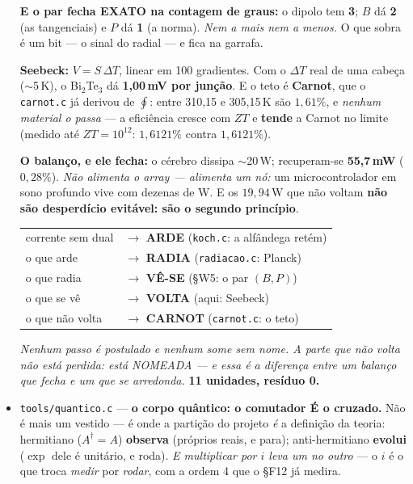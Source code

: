 \documentclass[11pt]{article}
\newcommand{\code}[1]{\texttt{\small #1}}
\theoremstyle{plain}
\theoremstyle{remark}
\begin{document}
\begin{itemize}
\textbf{E o par fecha EXATO na contagem de graus:} o dipolo tem \textbf{3}; $B$ dá \textbf{2} (as
tangenciais) e $P$ dá \textbf{1} (a norma). \emph{Nem a mais nem a menos.} O que sobra é um bit --- o
sinal do radial --- e fica na garrafa.

\textbf{Seebeck:} $V = S\,\Delta T$, linear em 100 gradientes. Com o $\Delta T$ real de uma cabeça
($\sim$5\,K), o Bi$_2$Te$_3$ dá \textbf{1,00\,mV por junção}. E o teto é \textbf{Carnot}, que o
\code{carnot.c} já derivou de $\oint$: entre 310,15 e 305,15\,K são $1{,}61\%$, e \emph{nenhum
material o passa} --- a eficiência cresce com $ZT$ e \textbf{tende} a Carnot no limite (medido até
$ZT = 10^{12}$: $1{,}6121\%$ contra $1{,}6121\%$).

\textbf{O balanço, e ele fecha:} o cérebro dissipa $\sim$20\,W; recuperam-se \textbf{55,7\,mW}
($0{,}28\%$). \emph{Não alimenta o array --- alimenta um nó:} um microcontrolador em sono profundo
vive com dezenas de \textmu W. E os $19{,}94$\,W que não voltam \textbf{não são desperdício
evitável: são o segundo princípio}.

\begin{center}
\begin{tabular}{ll}
\toprule
corrente sem dual & $\to$ \textbf{ARDE} \quad (\code{koch.c}: a alfândega retém) \\
o que arde & $\to$ \textbf{RADIA} \quad (\code{radiacao.c}: Planck) \\
o que radia & $\to$ \textbf{VÊ-SE} \quad (§W5: o par $(B,P)$) \\
o que se vê & $\to$ \textbf{VOLTA} \quad (aqui: Seebeck) \\
o que não volta & $\to$ \textbf{CARNOT} \quad (\code{carnot.c}: o teto) \\
\bottomrule
\end{tabular}
\end{center}

\emph{Nenhum passo é postulado e nenhum some sem nome. A parte que não volta não está perdida: está
NOMEADA --- e essa é a diferença entre um balanço que fecha e um que se arredonda.}
\textbf{11 unidades, resíduo 0.}


\item \code{tools/quantico.c} --- \textbf{o corpo quântico: o comutador É o cruzado.} Não é mais um
vestido --- é onde a partição do projeto \emph{é} a definição da teoria: hermitiano ($A^\dagger=A$)
\textbf{observa} (próprios reais, e para); anti-hermitiano \textbf{evolui} ($\exp$ dele é unitário, e
roda). \emph{E multiplicar por $i$ leva um no outro} --- o $i$ é o que troca \emph{medir} por
\emph{rodar}, com a ordem 4 que o §F12 já medira.


\end{itemize}
\end{document}
